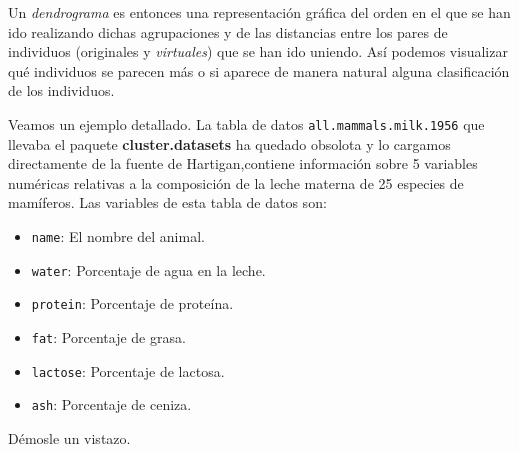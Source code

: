 \documentclass[
]{book}
\providecommand{\tightlist}{%
  \setlength{\itemsep}{0pt}\setlength{\parskip}{0pt}}
\theoremstyle{definition}
\theoremstyle{definition}
\theoremstyle{definition}
\theoremstyle{remark}
\begin{document}
Un \emph{dendrograma} es entonces una representación gráfica del orden en el que se han ido realizando dichas agrupaciones y de las distancias entre los pares de individuos (originales y \emph{virtuales}) que se han ido uniendo. Así podemos visualizar qué individuos se parecen más o si aparece de manera natural alguna clasificación de los individuos.

Veamos un ejemplo detallado.
La tabla de datos \texttt{all.mammals.milk.1956} que llevaba el paquete \textbf{cluster.datasets} ha quedado obsolota y lo cargamos directamente de la fuente de Hartigan,contiene información sobre 5 variables numéricas relativas a la composición de la leche materna de 25 especies de mamíferos. Las variables de esta tabla de datos son:

\begin{itemize}
\tightlist
\item
  \texttt{name}: El nombre del animal.
\item
  \texttt{water}: Porcentaje de agua en la leche.
\item
  \texttt{protein}: Porcentaje de proteína.
\item
  \texttt{fat}: Porcentaje de grasa.
\item
  \texttt{lactose}: Porcentaje de lactosa.
\item
  \texttt{ash}: Porcentaje de ceniza.
\end{itemize}

Démosle un vistazo.
\end{document}
